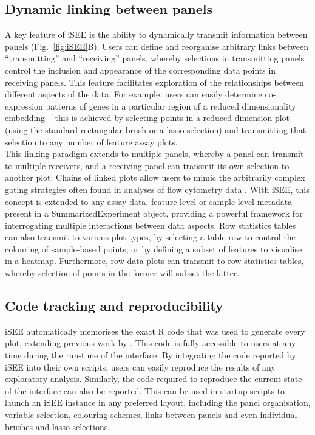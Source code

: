 \documentclass[10pt,a4paper,twocolumn]{article}
\begin{document}
\subsection*{Dynamic linking between panels}
A key feature of iSEE is the ability to dynamically transmit information between panels (Fig.~\ref{fig:iSEE}B).
Users can define and reorganise arbitrary links between ``transmitting'' and ``receiving'' panels, whereby selections in transmitting panels control the inclusion and appearance of the corresponding data points in receiving panels.
This feature facilitates exploration of the relationships between different aspects of the data.
For example, users can easily determine co-expression patterns of genes in a particular region of a reduced dimensionality embedding -- this is achieved by selecting points in a reduced dimension plot (using the standard rectangular brush or a lasso selection) and transmitting that selection to any number of feature assay plots.\\

This linking paradigm extends to multiple panels, whereby a panel can transmit to multiple receivers, and a receiving panel can transmit its own selection to another plot.
Chains of linked plots allow users to mimic the arbitrarily complex gating strategies often found in analyses of flow cytometry data \citep{finak2014opencyto}.
With iSEE, this concept is extended to any assay data, feature-level or sample-level metadata present in a SummarizedExperiment object, providing a powerful framework for interrogating multiple interactions between data aspects.
Row statistics tables can also transmit to various plot types, by selecting a table row to control the colouring of sample-based points;
or by defining a subset of features to visualise in a heatmap.
Furthermore, row data plots can transmit to row statistics tables, whereby selection of points in the former will subset the latter.

\subsection*{Code tracking and reproducibility}

iSEE automatically memorises the exact R code that was used to generate every plot, extending previous work by \citet{marini2016interrepro}.
This code is fully accessible to users at any time during the run-time of the interface.
By integrating the code reported by iSEE into their own scripts, users can easily reproduce the results of any exploratory analysis.
Similarly, the code required to reproduce the current state of the interface can also be reported.
This can be used in startup scripts to launch an iSEE instance in any preferred layout, including the panel organisation, variable selection, colouring schemes, links between panels and even individual brushes and lasso selections.
\end{document}
